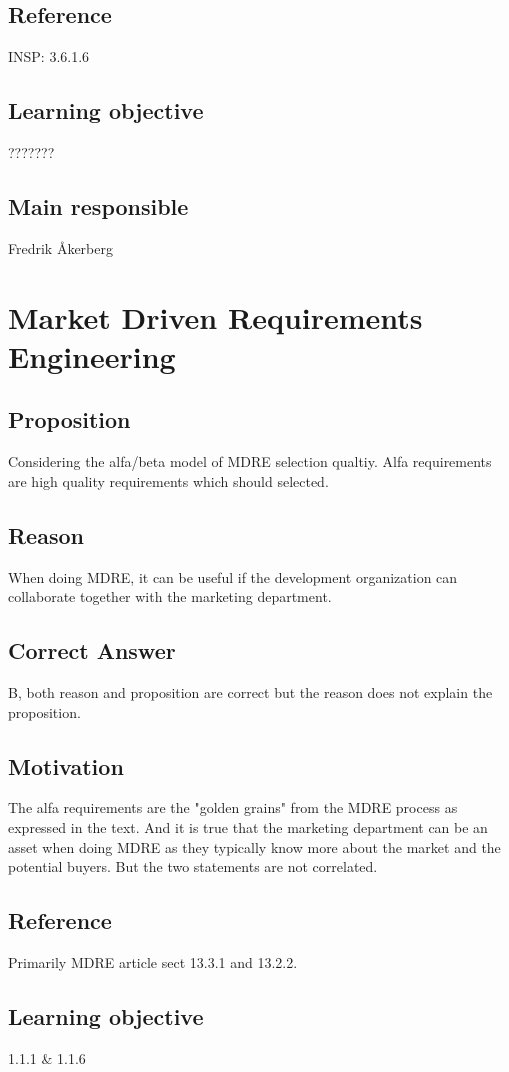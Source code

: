 \documentclass[a4paper]{article}
\begin{document}
\subsection*{Reference}
INSP: 3.6.1.6
\subsection*{Learning objective}
???????
\subsection*{Main responsible}
Fredrik Åkerberg



\section{Market Driven Requirements Engineering}
\subsection*{Proposition}
Considering the alfa/beta model of MDRE selection qualtiy. Alfa requirements are high quality requirements which should selected.
\subsection*{Reason}
When doing MDRE, it can be useful if the development organization can collaborate together with the marketing department.
\subsection*{Correct Answer}
B, both reason and proposition are correct but the reason does not explain the proposition.
\subsection*{Motivation}
The alfa requirements are the "golden grains" from the MDRE process as expressed in the text. And it is true that the marketing department can be an asset when doing MDRE as they typically know more about the market and the potential buyers. But the two statements are not correlated.
\subsection*{Reference}
Primarily MDRE article sect 13.3.1 and 13.2.2.
\subsection*{Learning objective}
1.1.1 \& 1.1.6
\end{document}
